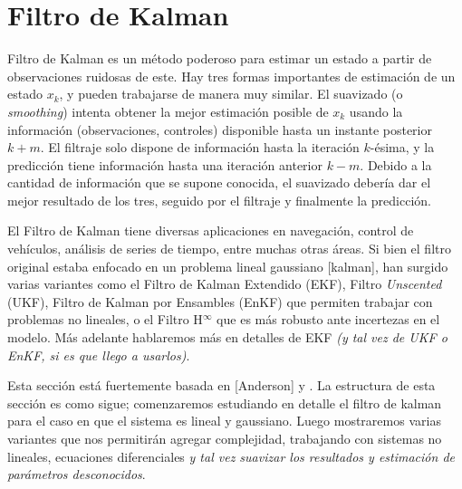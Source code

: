 \section{Filtro de Kalman}\label{sec:kalman}


Filtro de Kalman es un método poderoso para estimar un estado a partir de observaciones ruidosas de este. Hay tres formas importantes de estimación de un estado \(x_k\), y pueden trabajarse de manera muy similar. El suavizado (o \emph{smoothing}) intenta obtener la mejor estimación posible de \(x_k\) usando la información (observaciones, controles) disponible hasta un instante posterior \(k+m\). El filtraje solo dispone de información hasta la iteración \(k\)-ésima, y la predicción tiene información hasta una iteración anterior \(k-m\). Debido a la cantidad de información que se supone conocida, el suavizado debería dar el mejor resultado de los tres, seguido por el filtraje y finalmente la predicción. 

El Filtro de Kalman tiene diversas aplicaciones en navegación, control de vehículos, análisis de series de tiempo, entre muchas otras áreas. Si bien el filtro original estaba enfocado en un problema lineal gaussiano [kalman], han surgido varias variantes como el Filtro de Kalman Extendido (EKF), Filtro \textit{Unscented} (UKF), Filtro de Kalman por Ensambles (EnKF) que permiten trabajar con problemas no lineales, o el Filtro H\(^\infty\) que es más robusto ante incertezas en el modelo. Más adelante hablaremos más en detalles de EKF \textit{(y tal vez de UKF o EnKF, si es que llego a usarlos)}.


Esta sección está fuertemente basada en [Anderson] y \cite{Simon2006}. La estructura de esta sección es como sigue; comenzaremos estudiando en detalle el filtro de kalman para el caso en que el sistema es lineal y gaussiano. Luego mostraremos varias variantes que nos permitirán agregar complejidad, trabajando con sistemas no lineales, ecuaciones diferenciales\textit{ y tal vez suavizar los resultados y estimación de parámetros desconocidos}.

